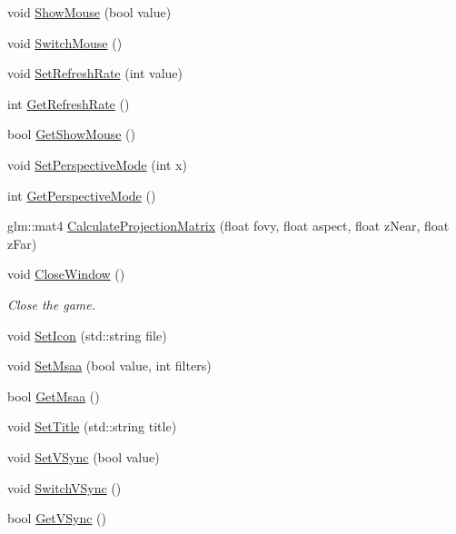 \begin{DoxyCompactItemize}
\item 
void \mbox{\hyperlink{class_window_a512773cac894acf5fcb747050f23ca57}{Show\+Mouse}} (bool value)
\item 
void \mbox{\hyperlink{class_window_a89151a47b0118a6f3c5d5f7939e080ed}{Switch\+Mouse}} ()
\item 
void \mbox{\hyperlink{class_window_aa3bb9982825282e226aa160d46278559}{Set\+Refresh\+Rate}} (int value)
\item 
int \mbox{\hyperlink{class_window_a6e208952c08cdc852d3204c91c7f523a}{Get\+Refresh\+Rate}} ()
\item 
bool \mbox{\hyperlink{class_window_a20848a2e0ef94a387707738917dd76d6}{Get\+Show\+Mouse}} ()
\item 
void \mbox{\hyperlink{class_window_ad4cc993a746593337163e9b998efb3e5}{Set\+Perspective\+Mode}} (int x)
\item 
int \mbox{\hyperlink{class_window_a325a7a9785e031c9025c93dbec3f21f1}{Get\+Perspective\+Mode}} ()
\item 
glm\+::mat4 \mbox{\hyperlink{class_window_ad82e66f4b582e9dc6215dee81cc03e6a}{Calculate\+Projection\+Matrix}} (float fovy, float aspect, float z\+Near, float z\+Far)
\item 
\mbox{\label{class_window_a14e9c06af1648e53b235b0ab99cac32d}} 
void \mbox{\hyperlink{class_window_a14e9c06af1648e53b235b0ab99cac32d}{Close\+Window}} ()
\begin{DoxyCompactList}\small\item\em Close the game. \end{DoxyCompactList}\item 
void \mbox{\hyperlink{class_window_a4275c9bf6717a8365f1d89fbe03e2e8b}{Set\+Icon}} (std\+::string file)
\item 
void \mbox{\hyperlink{class_window_aebff502aa62f526a058c3cda6bae6ed4}{Set\+Msaa}} (bool value, int filters)
\item 
bool \mbox{\hyperlink{class_window_a4d095b2ba52acc1ac65bed29443f3254}{Get\+Msaa}} ()
\item 
void \mbox{\hyperlink{class_window_a4b2829cb820c5a7232e641c571faccb3}{Set\+Title}} (std\+::string title)
\item 
void \mbox{\hyperlink{class_window_afa6d844ee8fa9a35ac6fc5db24c72e1d}{Set\+V\+Sync}} (bool value)
\item 
void \mbox{\hyperlink{class_window_a50875755f703cf58788146c80e5f752c}{Switch\+V\+Sync}} ()
\item 
bool \mbox{\hyperlink{class_window_a5b19fe2f1cb52d0321771b305ec06b93}{Get\+V\+Sync}} ()

\end{DoxyCompactItemize}
